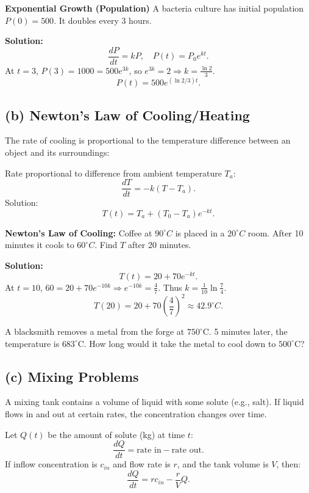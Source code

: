   \begin{example}
    \textbf{Exponential Growth (Population)}
    A bacteria culture has initial population $P(0)=500$. It doubles every 3 hours.

    \textbf{Solution:}
    \[
    \frac{dP}{dt} = kP, \quad P(t)=P_0e^{kt}.
    \]
    At $t=3$, $P(3)=1000=500e^{3k}$, so $e^{3k}=2 \Rightarrow k=\tfrac{\ln 2}{3}$.
    \[
    P(t) = 500 e^{(\ln 2/3)t}.
    \]
  \end{example}


\subsection*{(b) Newton's Law of Cooling/Heating}
  The rate of cooling is proportional to the temperature difference between an object and its surroundings:

  \noindent Rate proportional to difference from ambient temperature $T_a$:
  \[
  \frac{dT}{dt} = -k(T - T_a).
  \]
  Solution:
  \[
  T(t) = T_a + (T_0 - T_a)e^{-kt}.
  \]

  \begin{question}
    \textbf{Newton's Law of Cooling:}
    Coffee at $90^\circ C$ is placed in a $20^\circ C$ room. After 10 minutes it cools to $60^\circ C$. Find $T$ after 20 minutes.

    \textbf{Solution:}
    \[
    T(t) = 20 + 70e^{-kt}.
    \]
    At $t=10$, $60=20+70e^{-10k} \Rightarrow e^{-10k} = \tfrac{4}{7}$.
    Thus $k = \tfrac{1}{10}\ln \tfrac{7}{4}$.
    \[
    T(20) = 20 + 70\left(\frac{4}{7}\right)^2 \approx 42.9^\circ C.
    \]
  \end{question}

  \begin{question}
    A blacksmith removes a metal from the forge at \(750^{\circ}\)C.
    5 minutes later, the temperature is \(683^{\circ}\)C.
    How long would it take the metal to cool down to \(500^{\circ}\)C?
  \end{question}


\subsection*{(c) Mixing Problems}
  A mixing tank contains a volume of liquid with some solute (e.g., salt). If liquid flows in and out at certain rates, the concentration changes over time.

  \noindent Let $Q(t)$ be the amount of solute (kg) at time $t$:
  \[
  \frac{dQ}{dt} = \text{rate in} - \text{rate out}.
  \]
  If inflow concentration is $c_{in}$ and flow rate is $r$, and the tank volume is $V$, then:
  \[
  \frac{dQ}{dt} = r c_{in} - \frac{r}{V}Q.
  \]
  

